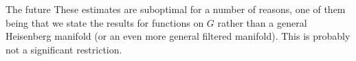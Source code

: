 \documentclass{beamer}
\numberwithin{equation}{section}
\theoremstyle{plain}
\theoremstyle{plain}
\theoremstyle{definition}
\theoremstyle{plain}
\theoremstyle{plain}
\theoremstyle{definition}
\begin{document}
\begin{frame}{The future}
These estimates are suboptimal for a number of reasons, one of them being that we state the results for functions on $G$ rather than a general Heisenberg manifold (or an even more general filtered manifold). This is probably not a significant restriction.
\end{frame}



\begin{frame}
\end{frame}
\end{document}
